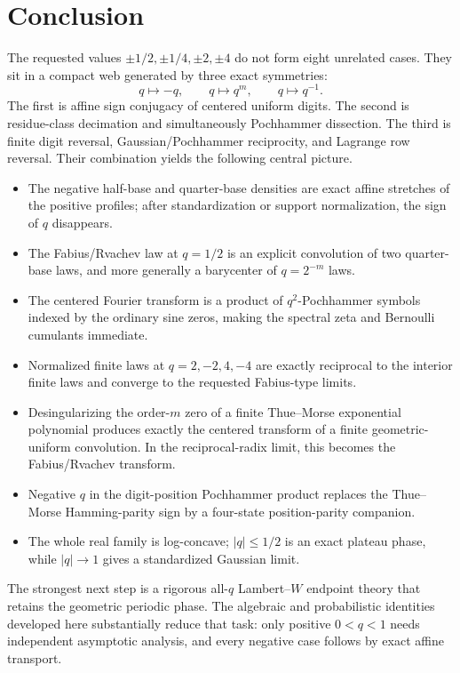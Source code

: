 \documentclass[11pt,oneside]{article}
\theoremstyle{definition}
\theoremstyle{remark}
\begin{document}
\section{Conclusion}
The requested values \(\pm1/2,\pm1/4,\pm2,\pm4\) do not form eight unrelated
cases.  They sit in a compact web generated by three exact symmetries:
\[
 q\longmapsto-q,
 \qquad
 q\longmapsto q^m,
 \qquad
 q\longmapsto q^{-1}.
\]
The first is affine sign conjugacy of centered uniform digits.  The second is
residue-class decimation and simultaneously Pochhammer dissection.  The third
is finite digit reversal, Gaussian/Pochhammer reciprocity, and Lagrange row
reversal.  Their combination yields the following central picture.

\begin{itemize}
\item The negative half-base and quarter-base densities are exact affine
  stretches of the positive profiles; after standardization or support
  normalization, the sign of \(q\) disappears.
\item The Fabius/Rvachev law at \(q=1/2\) is an explicit convolution of two
  quarter-base laws, and more generally a barycenter of \(q=2^{-m}\) laws.
\item The centered Fourier transform is a product of \(q^2\)-Pochhammer
  symbols indexed by the ordinary sine zeros, making the spectral zeta and
  Bernoulli cumulants immediate.
\item Normalized finite laws at \(q=2,-2,4,-4\) are exactly reciprocal to the
  interior finite laws and converge to the requested Fabius-type limits.
\item Desingularizing the order-\(m\) zero of a finite Thue--Morse exponential
  polynomial produces exactly the centered transform of a finite
  geometric-uniform convolution.  In the reciprocal-radix limit, this becomes
  the Fabius/Rvachev transform.
\item Negative \(q\) in the digit-position Pochhammer product replaces the
  Thue--Morse Hamming-parity sign by a four-state position-parity companion.
\item The whole real family is log-concave; \(|q|\le1/2\) is an exact plateau
  phase, while \(|q|\to1\) gives a standardized Gaussian limit.
\end{itemize}

The strongest next step is a rigorous all-\(q\) Lambert--\(W\) endpoint theory
that retains the geometric periodic phase.  The algebraic and probabilistic
identities developed here substantially reduce that task: only positive
\(0<q<1\) needs independent asymptotic analysis, and every negative case follows
by exact affine transport.
\end{document}
